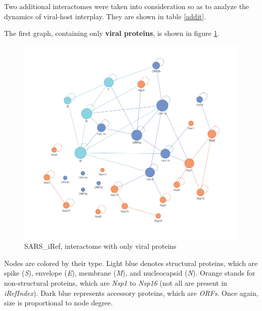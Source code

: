 \documentclass[a4paper]{article}
\begin{document}
Two additional interactomes were taken into consideration so as to analyze the dynamics of viral-host interplay. They are shown in table \ref{addit}.

\begin{table}[h!]
  \centering
  \caption{Additional interactomes and their properties}
  \label{addit}
\end{table}

The first graph, containing only \textbf{viral proteins}, is shown in figure \ref{viral}.

\begin{figure}[h!]
  \centering
  \includegraphics[scale=0.55]{SARS_iRef.png}
  \caption{SARS\_iRef, interactome with only viral proteins}
  \label{viral}
\end{figure}

Nodes are colored by their type. Light blue denotes structural proteins, which are spike (\textit{S}), envelope (\textit{E}), membrane (\textit{M}), and nucleocapsid (\textit{N}). Orange stands for non-structural proteins, which are \textit{Nsp1} to \textit{Nsp16} (not all are present in \textit{iRefIndex}). Dark blue represents accessory proteins, which are \textit{ORFs}. Once again, size is proportional to node degree.
\end{document}
